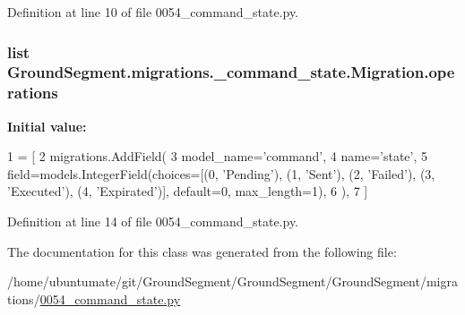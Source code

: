 Definition at line 10 of file 0054\+\_\+command\+\_\+state.\+py.

\hypertarget{class_ground_segment_1_1migrations_1_10054__command__state_1_1_migration_ae9e43473e39f5df3a98dbd3addfc7e99}{}
\subsubsection[{operations}]{\setlength{\rightskip}{0pt plus 5cm}list Ground\+Segment.\+migrations.\+\_\+command\+\_\+state.\+Migration.\+operations\hspace{0.3cm}{\ttfamily [static]}}\label{class_ground_segment_1_1migrations_1_10054__command__state_1_1_migration_ae9e43473e39f5df3a98dbd3addfc7e99}
{\bfseries Initial value\+:}
\begin{DoxyCode}
1 = [
2         migrations.AddField(
3             model\_name=\textcolor{stringliteral}{'command'},
4             name=\textcolor{stringliteral}{'state'},
5             field=models.IntegerField(choices=[(0, \textcolor{stringliteral}{'Pending'}), (1, \textcolor{stringliteral}{'Sent'}), (2, \textcolor{stringliteral}{'Failed'}), (3, \textcolor{stringliteral}{'Executed'}),
       (4, \textcolor{stringliteral}{'Expirated'})], default=0, max\_length=1),
6         ),
7     ]
\end{DoxyCode}


Definition at line 14 of file 0054\+\_\+command\+\_\+state.\+py.



The documentation for this class was generated from the following file\+:\begin{DoxyCompactItemize}
\item 
/home/ubuntumate/git/\+Ground\+Segment/\+Ground\+Segment/\+Ground\+Segment/migrations/\hyperlink{0054__command__state_8py}{0054\+\_\+command\+\_\+state.\+py}\end{DoxyCompactItemize}
